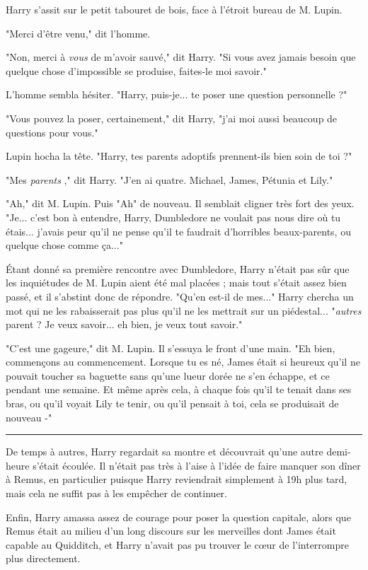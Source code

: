 Harry s'assit sur le petit tabouret de bois, face à l'étroit bureau de M. Lupin.

"Merci d'être venu," dit l'homme.

"Non, merci à \emph{vous}  de m'avoir sauvé," dit Harry. "Si vous avez jamais besoin que quelque chose d'impossible se produise, faites-le moi savoir."

L'homme sembla hésiter. "Harry, puis-je... te poser une question personnelle ?"

"Vous pouvez la poser, certainement," dit Harry, "j'ai moi aussi beaucoup de questions pour vous."

Lupin hocha la tête. "Harry, tes parents adoptifs prennent-ils bien soin de toi ?"

"Mes \emph{parents} ," dit Harry. "J'en ai quatre. Michael, James, Pétunia et Lily."

"Ah," dit M. Lupin. Puis "Ah" de nouveau. Il semblait cligner très fort des yeux. "Je... c'est bon à entendre, Harry, Dumbledore ne voulait pas nous dire où tu étais... j'avais peur qu'il ne pense qu'il te faudrait d'horribles beaux-parents, ou quelque chose comme ça..."

Étant donné sa première rencontre avec Dumbledore, Harry n'était pas sûr que les inquiétudes de M. Lupin aient été mal placées ; mais tout s'était assez bien passé, et il s'abstint donc de répondre. "Qu'en est-il de mes..." Harry chercha un mot qui ne les rabaisserait pas plus qu'il ne les mettrait sur un piédestal... "\emph{autres}  parent ? Je veux savoir... eh bien, je veux tout savoir."

"C'est une gageure," dit M. Lupin. Il s'essuya le front d'une main. "Eh bien, commençons au commencement. Lorsque tu es né, James était si heureux qu'il ne pouvait toucher sa baguette sans qu'une lueur dorée ne s'en échappe, et ce pendant une semaine. Et même après cela, à chaque fois qu'il te tenait dans ses bras, ou qu'il voyait Lily te tenir, ou qu'il pensait à toi, cela se produisait de nouveau -"
\par\noindent\rule{\textwidth}{0.4pt}
De temps à autres, Harry regardait sa montre et découvrait qu'une autre demi-heure s'était écoulée. Il n'était pas très à l'aise à l'idée de faire manquer son dîner à Remus, en particulier puisque Harry reviendrait simplement à 19h plus tard, mais cela ne suffit pas à les empêcher de continuer.

Enfin, Harry amassa assez de courage pour poser la question capitale, alors que Remus était au milieu d'un long discours sur les merveilles dont James était capable au Quidditch, et Harry n'avait pas pu trouver le cœur de l'interrompre plus directement.

